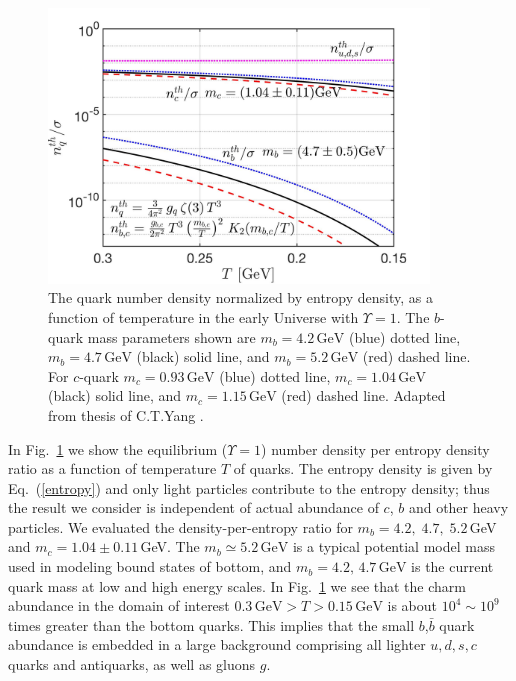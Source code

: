 \begin{figure}[t]
\begin{center}
\includegraphics[width=0.9\textwidth]{./plots/bcQuarkDensity_new}
\caption{
The quark number density normalized by entropy density, as a function of temperature in the early Universe with $\Upsilon=1$. The $b$-quark mass parameters shown are $m_b=4.2\,\mathrm{GeV}$ (blue) dotted line, $m_b=4.7\,\mathrm{GeV}$ (black) solid line, and $m_b=5.2\,\mathrm{GeV}$ (red) dashed line. For  $c$-quark  $m_c=0.93\,\mathrm{GeV}$  (blue) dotted line, $m_c=1.04\,\mathrm{GeV}$ (black) solid line, and $m_c=1.15\,\mathrm{GeV}$ (red) dashed line. Adapted from thesis of C.T.Yang \cite{Yang:2024ret}.}
\label{number_entropy_b002}
\end{center}
\end{figure}


In Fig.~\ref{number_entropy_b002} we show the equilibrium ($\Upsilon=1$) number density per entropy density  ratio as a function of temperature $T$ of quarks. The entropy density is given by Eq.~(\ref{entropy}) and only light particles contribute to the entropy density; thus the result we consider is independent of actual abundance of $c$, $b$ and other heavy particles. We evaluated the density-per-entropy ratio for  $m_b=4.2,\;4.7,\;5.2$\,GeV and $m_c=1.04\pm0.11$\,GeV. The $m_b\simeq 5.2\,\mathrm{GeV}$ is  a typical potential model mass used in modeling bound states of bottom, and $m_b=4.2,\,4.7\,\mathrm{GeV}$ is the current quark mass at low and high energy scales. In Fig.~\ref{number_entropy_b002} we see that the charm abundance in the domain of interest $0.3\,\mathrm{GeV}>T>0.15\,\mathrm{GeV}$ is about $10^4\sim\!\!10^{9}$ times greater than the bottom quarks. This implies that the small $b$,$\bar b$ quark abundance is embedded in a large background comprising all lighter $u,d,s,c$ quarks and antiquarks, as well as gluons $g$.

